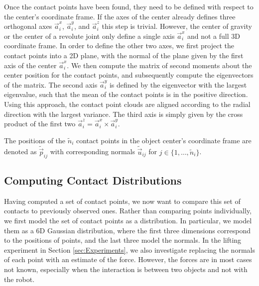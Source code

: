 Once the contact points have been found, they need to be defined with
respect to the center's coordinate frame. If the axes of the center
already defines three orthogonal axes $\vec{a}_{i}^{x}$, $\vec{a}_{i}^{y}$,
and $\vec{a}_{i}^{z}$ this step is trivial. However, the center of
gravity or the center of a revolute joint only define a single axis
$\vec{a}_{i}^{x}$ and not a full 3D coordinate frame. In order to
define the other two axes, we first project the contact points into
a 2D plane, with the normal of the plane given by the first axis of
the center $\vec{a}_{i}^{x}$. We then compute the matrix of second moments
 about the center position for the contact points, and subsequently compute the eigenvectors
of the matrix. The second axis $\vec{a}_{i}^{y}$ is defined by the
eigenvector with the largest eigenvalue, such that the mean of the
contact points is in the positive direction. Using this approach,
the contact point clouds are aligned according to the radial direction
with the largest variance. The third axis is simply given by the cross
product of the first two $\vec{a}_{i}^{z}=\vec{a}_{i}^{x}\times\vec{a}_{i}^{y}$. 

The positions of the $\tilde{n}_{i}$ contact points in the object
center's coordinate frame are denoted as $\tilde{\vec{p}}_{ij}$ with
corresponding normals $\tilde{\vec{u}}_{ij}$ for $j\in\{1,\ldots,\tilde{n}_{i}\}$. 


\subsection{Computing Contact Distributions\label{sub:Computing-Contact-Distributions}}

Having computed a set of contact points, we now want to compare this
set of contacts to previously observed ones. Rather than comparing
points individually, we first model the set of contact points as a
distribution. In particular, we model them as a 6D Gaussian distribution,
where the first three dimensions correspond to the positions of points,
and the last three model the normals. In the lifting experiment in
Section \ref{sec:Experiments}, we also investigate replacing the
normals of each point with an estimate of the force. However, the
forces are in most cases not known, especially when the interaction
is between two objects and not with the robot.

